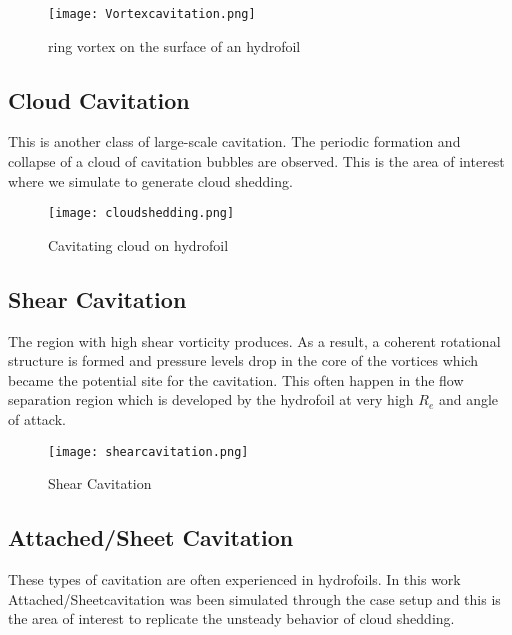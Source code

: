 \begin{figure}[H]
 \centering
 \texttt{[image: Vortexcavitation.png]}
 \caption{ring vortex on the surface of an hydrofoil}
  \label{fig:fig7}
\end{figure}
\subsection{Cloud Cavitation}

This is another class of large-scale cavitation. The periodic
formation and collapse of a cloud of cavitation bubbles are
observed. This is the area of interest where we simulate to generate
cloud shedding.

\begin{figure}[H]
 \centering
 \texttt{[image: cloudshedding.png]}
 \caption{Cavitating cloud on hydrofoil}
 \label{fig:fig8}
\end{figure} 

\subsection{Shear Cavitation}
The region with high shear vorticity produces.  As a result, a
coherent rotational structure is formed and pressure levels drop in
the core of the vortices which became the potential site for the
cavitation. This often happen in the flow separation region which is
developed by the hydrofoil at very high $R_e$ and angle of attack.

\begin{figure}[H]
 \centering
 \texttt{[image: shearcavitation.png]}
 \caption{Shear Cavitation}
  \label{fig:fig9}
\end{figure}

\subsection{Attached/Sheet Cavitation}
These types of cavitation are often experienced in hydrofoils. In this
work Attached/Sheetcavitation was been simulated through the case
setup and this is the area of interest to replicate the unsteady
behavior of cloud shedding.\\

